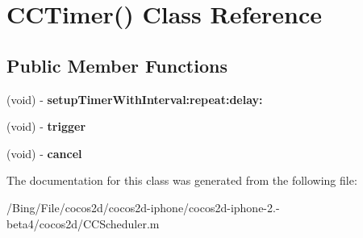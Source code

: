 \hypertarget{interface_c_c_timer_07_08}{\section{C\-C\-Timer() Class Reference}
\label{interface_c_c_timer_07_08}
}
\subsection*{Public Member Functions}
\begin{DoxyCompactItemize}
\item 
\hypertarget{interface_c_c_timer_07_08_a44e5cc4fed2e30d9e0dff136913d6d07}{(void) -\/ {\bfseries setup\-Timer\-With\-Interval\-:repeat\-:delay\-:}}\label{interface_c_c_timer_07_08_a44e5cc4fed2e30d9e0dff136913d6d07}

\item 
\hypertarget{interface_c_c_timer_07_08_abeb9961e2ce334cf982fc4ae38615704}{(void) -\/ {\bfseries trigger}}\label{interface_c_c_timer_07_08_abeb9961e2ce334cf982fc4ae38615704}

\item 
\hypertarget{interface_c_c_timer_07_08_a6b413823ce53bb60f78f04e05711d012}{(void) -\/ {\bfseries cancel}}\label{interface_c_c_timer_07_08_a6b413823ce53bb60f78f04e05711d012}

\end{DoxyCompactItemize}


The documentation for this class was generated from the following file\-:\begin{DoxyCompactItemize}
\item 
/\-Bing/\-File/cocos2d/cocos2d-\/iphone/cocos2d-\/iphone-\/2.-\/beta4/cocos2d/C\-C\-Scheduler.\-m\end{DoxyCompactItemize}
